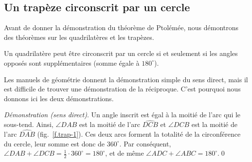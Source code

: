 \subsection{Un trapèze circonscrit par un cercle}\label{s.circumscribed}

Avant de donner la démonstration du théorème de Ptolémée, nous démontrons des théorèmes sur les quadrilatères et les trapèzes.

\begin{theorem}\label{thm.quad-circum}
Un quadrilatère peut être circonscrit par un cercle si et seulement si les angles opposés sont supplémentaires (somme égale à $180^\circ$).
\end{theorem}

Les manuels de géométrie donnent la démonstration simple du sens direct, mais il est difficile de trouver une démonstration de la réciproque. C'est pourquoi nous donnons ici les deux démonstrations.

\noindent \emph{Démonstration (sens direct)}. 
Un angle inscrit est égal à la moitié de l'arc qui le sous-tend. Ainsi, $\angle DAB$ est la moitié de l'arc $\widehat{DCB}$ et $\angle DCB$ est la moitié de l'arc $\widehat{DAB}$ (fig.~\ref{f.trap-1}). Ces deux arcs forment la totalité de la circonférence du cercle, leur somme est donc de $360^\circ$. Par conséquent, $\angle DAB + \angle DCB = \frac{1}{2} \cdot 360^\circ = 180^\circ$, et de même $\angle ADC + \angle ABC = 180^\circ$.\qed



\vspace{0.4cm}

